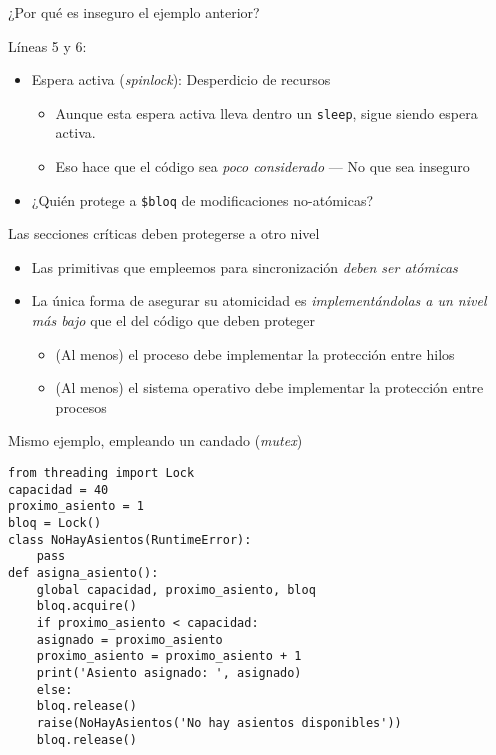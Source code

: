 \documentclass[presentation]{beamer}
\begin{document}
\begin{frame}[label={sec:orga4695c1},fragile]{¿Por qué es inseguro el ejemplo anterior?}
 \begin{center}
Líneas 5 y 6:
\end{center}
\begin{itemize}
\item Espera activa (\emph{spinlock}): Desperdicio de recursos
\begin{itemize}
\item Aunque esta espera activa lleva dentro un \texttt{sleep}, sigue siendo
espera activa.
\item Eso hace que el código sea \emph{poco considerado} — No que sea inseguro
\end{itemize}
\item ¿Quién protege a \texttt{\$bloq} de modificaciones no-atómicas?
\end{itemize}
\end{frame}

\begin{frame}[label={sec:org922876f}]{Las secciones críticas deben protegerse a otro nivel}
\begin{itemize}
\item Las primitivas que empleemos para sincronización \emph{deben ser
atómicas}
\item La única forma de asegurar su atomicidad es \emph{implementándolas a un
nivel más bajo} que el del código que deben proteger
\begin{itemize}
\item (Al menos) el proceso debe implementar la protección entre hilos
\item (Al menos) el sistema operativo debe implementar la protección
entre procesos
\end{itemize}
\end{itemize}
\end{frame}

\begin{frame}[label={sec:org3b3c4c5},fragile]{Mismo ejemplo, empleando un candado (\emph{mutex})}
 \begin{verbatim}
from threading import Lock
capacidad = 40
proximo_asiento = 1
bloq = Lock()
class NoHayAsientos(RuntimeError):
    pass
def asigna_asiento():
    global capacidad, proximo_asiento, bloq
    bloq.acquire()
    if proximo_asiento < capacidad:
	asignado = proximo_asiento
	proximo_asiento = proximo_asiento + 1
	print('Asiento asignado: ', asignado)
    else:
	bloq.release()
	raise(NoHayAsientos('No hay asientos disponibles'))
    bloq.release()
\end{verbatim}
\end{frame}
\end{document}
